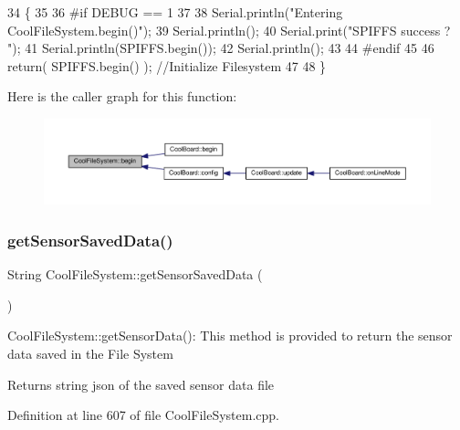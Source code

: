 \begin{DoxyCode}
34 \{
35 
36 \textcolor{preprocessor}{#if DEBUG == 1}
37 
38     Serial.println(\textcolor{stringliteral}{"Entering CoolFileSystem.begin()"});
39     Serial.println();   
40     Serial.print(\textcolor{stringliteral}{"SPIFFS success ? "});
41     Serial.println(SPIFFS.begin());
42     Serial.println();
43 
44 \textcolor{preprocessor}{#endif}
45 
46     \textcolor{keywordflow}{return}( SPIFFS.begin() );                                   \textcolor{comment}{//Initialize Filesystem}
47 
48 \}
\end{DoxyCode}
Here is the caller graph for this function\+:\nopagebreak
\begin{figure}[H]
\begin{center}
\leavevmode
\includegraphics[width=350pt]{classCoolFileSystem_a6ba6f666ed4c530174f8569d2c636748_icgraph}
\end{center}
\end{figure}
\mbox{\label{classCoolFileSystem_a5c58bca3735c0ed3efb268d70ef998ef}} 
\subsubsection{\texorpdfstring{get\+Sensor\+Saved\+Data()}{getSensorSavedData()}}
{\footnotesize\ttfamily String Cool\+File\+System\+::get\+Sensor\+Saved\+Data (\begin{DoxyParamCaption}{ }\end{DoxyParamCaption})}

Cool\+File\+System\+::get\+Sensor\+Data()\+: This method is provided to return the sensor data saved in the File System

\begin{DoxyReturn}{Returns}
string json of the saved sensor data file 
\end{DoxyReturn}


Definition at line 607 of file Cool\+File\+System.\+cpp.



